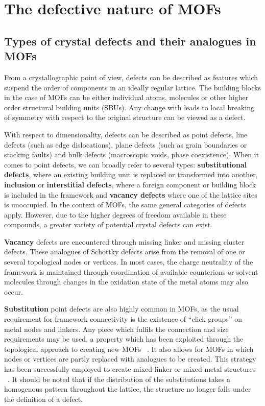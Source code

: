 
\section{The defective nature of MOFs}

\subsection{Types of crystal defects and their analogues in MOFs}

From a crystallographic point of view, defects can be described
as features which suspend the order of components in an ideally 
regular lattice. The building blocks in the case of MOFs can be either
individual atoms, molecules or other higher order structural building
units (SBUs). Any change with leads to local breaking of symmetry with
respect to the original structure can be viewed as a defect.

With respect to dimensionality, defects can be described 
as point defects, line defects (such as edge dislocations), 
plane defects (such as grain boundaries or stacking faults) and bulk 
defects (macroscopic voids, phase coexistence).
When it comes to point defects, we can broadly refer to several types: 
\textbf{substitutional defects}, where an existing building unit is 
replaced or transformed into another, \textbf{inclusion} or 
\textbf{interstitial defects}, where a foreign component
or building block is included in the framework and \textbf{vacancy defects}
where one of the lattice sites is unoccupied.
In the context of MOFs, the same general categories of defects 
apply. However, due to the higher degrees of freedom available in 
these compounds, a greater variety of potential crystal defects
can exist.

\textbf{Vacancy} defects are encountered through missing linker and 
missing cluster defects. These analogues of Schottky defects
arise from the removal of one or several topological nodes or vertices.
In most cases, the charge neutrality of the framework
is maintained through coordination of available counterions or solvent 
molecules through changes in the oxidation state of the metal atoms
may also occur.

\textbf{Substitution} point defects are also highly common in MOFs, as the
usual requirement for framework connectivity is the existence 
of ``click groups'' on metal nodes and linkers. Any 
piece which fulfils the connection and size requirements may 
be used, a property which has been exploited through the topological
approach to creating new MOFs
~\cite{burnettRecentAdvancesPorphyrinic2012,%
liTopologicalAnalysisMetal2014, stockSynthesisMetalOrganicFrameworks2012}.
It also allows for MOFs in which nodes or vertices are partly 
replaced with analogues to be created. This strategy has been 
successfully employed to create mixed-linker or mixed-metal structures
~\cite{buekenTacklingDefectConundrum2017,%
dhakshinamoorthyMixedmetalMixedlinkerMetal2016}.
It should be noted that if the distribution of the substitutions takes
a homogenous pattern throughout the lattice, the structure no 
longer falls under the definition of a defect.

